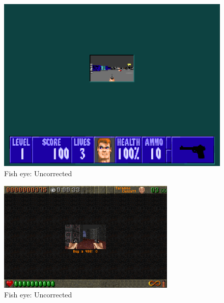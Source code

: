    \begin{figure}[H]
\centering
 \includegraphics[width=\textwidth]{screenshots/adjust_view/small.png}
  \caption{Fish eye: Uncorrected} 
 \end{figure}
 \par


    \begin{figure}[H]
\centering
 \includegraphics[width=\textwidth]{screenshots/adjust_view/rott.png}
  \caption{Fish eye: Uncorrected} 
 \end{figure}
 \par